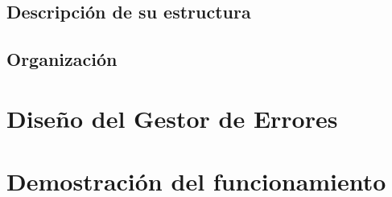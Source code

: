 \documentclass{article}
\begin{document}
\subsection{Descripción de su estructura}


\subsection{Organización}


\section{Diseño del Gestor de Errores}

\section{Demostración del funcionamiento}

\newpage

\newpage
\end{document}
